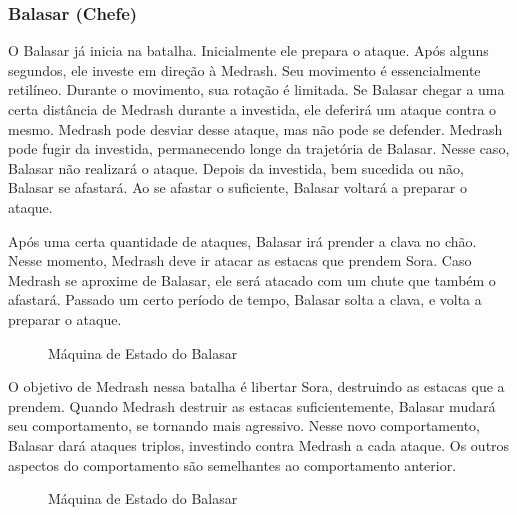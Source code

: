 \subsubsection{Balasar (Chefe)}

O Balasar já inicia na batalha. Inicialmente ele prepara o ataque.
Após alguns segundos, ele investe em direção à Medrash. Seu movimento
é essencialmente retilíneo. Durante o movimento, sua rotação é limitada.
Se Balasar chegar a uma certa distância de Medrash durante a investida,
ele deferirá um ataque contra o mesmo. Medrash pode desviar desse ataque,
mas não pode se defender. Medrash pode fugir da investida, permanecendo
longe da trajetória de Balasar. Nesse caso, Balasar não realizará o ataque.
Depois da investida, bem sucedida ou não, Balasar se afastará.
Ao se afastar o suficiente, Balasar voltará a preparar o ataque.

Após uma certa quantidade de ataques, Balasar irá prender a clava no
chão. Nesse momento, Medrash deve ir atacar as estacas que prendem Sora.
Caso Medrash se aproxime de Balasar, ele será atacado com um chute que
também o afastará. Passado um certo período de tempo, Balasar solta a
clava, e volta a preparar o ataque.

\begin{figure}[!ht]
 \centering
 \caption{Máquina de Estado do Balasar}
 \label{fsm:balasar_e1}
\end{figure}

O objetivo de Medrash nessa batalha é libertar Sora, destruindo as 
estacas que a prendem. Quando Medrash destruir as estacas suficientemente,
Balasar mudará seu comportamento, se tornando mais agressivo.
Nesse novo comportamento, Balasar dará ataques triplos, investindo contra
Medrash a cada ataque. Os outros aspectos do comportamento são semelhantes
ao comportamento anterior.

\begin{figure}[!ht]
 \centering
 \caption{Máquina de Estado do Balasar}
 \label{fsm:balasar_e2}
\end{figure}